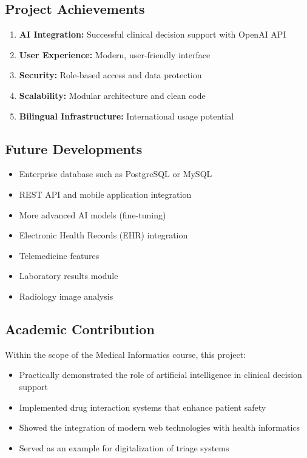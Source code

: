 \documentclass[12pt,a4paper]{article}
\begin{document}
\subsection{Project Achievements}
\begin{enumerate}
    \item \textbf{AI Integration:} Successful clinical decision support with OpenAI API
    \item \textbf{User Experience:} Modern, user-friendly interface
    \item \textbf{Security:} Role-based access and data protection
    \item \textbf{Scalability:} Modular architecture and clean code
    \item \textbf{Bilingual Infrastructure:} International usage potential
\end{enumerate}

\subsection{Future Developments}
\begin{itemize}
    \item Enterprise database such as PostgreSQL or MySQL
    \item REST API and mobile application integration
    \item More advanced AI models (fine-tuning)
    \item Electronic Health Records (EHR) integration
    \item Telemedicine features
    \item Laboratory results module
    \item Radiology image analysis
\end{itemize}

\subsection{Academic Contribution}
Within the scope of the Medical Informatics course, this project:
\begin{itemize}
    \item Practically demonstrated the role of artificial intelligence in clinical decision support
    \item Implemented drug interaction systems that enhance patient safety
    \item Showed the integration of modern web technologies with health informatics
    \item Served as an example for digitalization of triage systems
\end{itemize}
\end{document}
